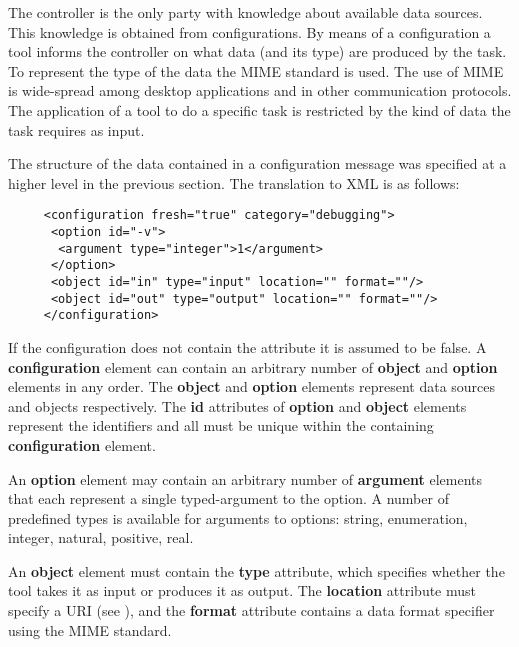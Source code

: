 \documentclass{article}
\begin{document}
   The controller is the only party with knowledge about available data
   sources. This knowledge is obtained from configurations. By means of a
   configuration a tool informs the controller on what data (and its type) are
   produced by the task. To represent the type of the data the MIME standard is
   used. The use of MIME is wide-spread among desktop applications and in other
   communication protocols. The application of a tool to do a specific task is
   restricted by the kind of data the task requires as input.

   The structure of the data contained in a configuration message was specified
   at a higher level in the previous section. The translation to XML is as
   follows:

    \begin{verbatim}
     <configuration fresh="true" category="debugging">
      <option id="-v">
       <argument type="integer">1</argument>
      </option>
      <object id="in" type="input" location="" format=""/>
      <object id="out" type="output" location="" format=""/>
     </configuration>\end{verbatim}

   \noindent If the configuration does not contain the  attribute
   it is assumed to be false. A \textbf{configuration} element can contain an
   arbitrary number of \textbf{object} and \textbf{option} elements in any
   order. The \textbf{object} and \textbf{option} elements represent data
   sources and objects respectively.  The \textbf{id} attributes of
   \textbf{option} and \textbf{object} elements represent the identifiers and
   all must be unique within the containing \textbf{configuration} element.  

   An \textbf{option} element may contain an arbitrary number of
   \textbf{argument} elements that each represent a single typed-argument to
   the option. A number of predefined types is available for arguments to
   options: string, enumeration, integer, natural, positive, real.

   An \textbf{object} element must contain the \textbf{type} attribute, which
   specifies whether the tool takes it as input or produces it as output. The
   \textbf{location} attribute must specify a URI (see \cite{rfc3305}),
   and the \textbf{format} attribute contains a data format specifier
   using the MIME standard.
\end{document}
